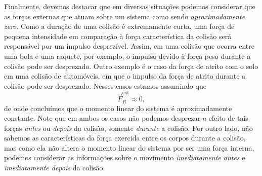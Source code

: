 Finalmente, devemos destacar que em diversas situações podemos considerar que as forças externas que atuam sobre um sistema como sendo \emph{aproximadamente zero}. Como a duração de uma colisão é extremamente curta, uma força de pequena intensidade em comparação à força característica da colisão será responsável por um impulso desprezível. Assim, em uma colisão que ocorra entre uma bola e uma raquete, por exemplo, o impulso devido à força peso durante a colisão pode ser desprezado. Outro exemplo é o caso da força de atrito com o solo em uma colisão de automóveis, em que o impulso da força de atrito durante a colisão pode ser desprezado. Nesses casos estamos assumindo que
\begin{equation}
    \vec{F}_R^{\text{ext}} \approx 0,
\end{equation}
%
de onde concluímos que o momento linear do sistema é aproximadamente constante. Note que em ambos os casos não podemos desprezar o efeito de tais forças \emph{antes} ou \emph{depois} da colisão, somente \emph{durante} a colisão. Por outro lado, não sabemos as características da força exercida entre os corpos durante a colisão, mas como ela não altera o momento linear do sistema por ser uma força interna, podemos considerar as informações sobre o movimento \emph{imediatamente antes} e \emph{imediatamente depois} da colisão. 


